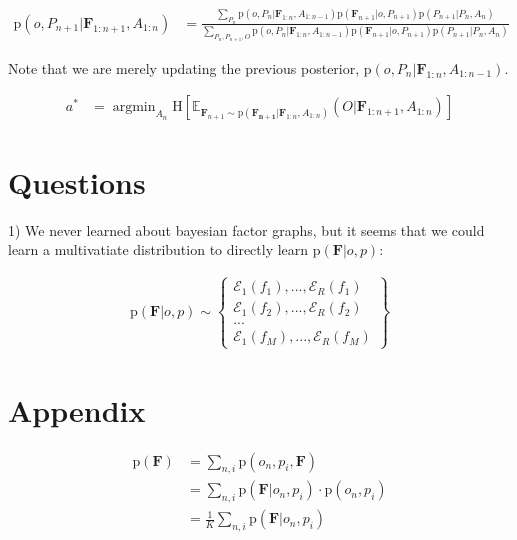 \documentclass[11pt]{article}
\newcommand{\ProbOpr}[1]{\mathbb{#1}} %
\newcommand{\SetOf}[1]{\mathbf{#1}} %
\newcommand{\prob}[1]{\text{p}(#1)} %
\newcommand{\entropy}[1]{\text{H}\left[#1\right]} %
\newcommand{\expectedValue}[2]{\ProbOpr{E}_{#2}\left(#1\right)} %
\DeclareMathOperator*{\argmin}{argmin}
\newcommand{\Eq}[1]{\begin{align*}#1\end{align*}} %
\newcommand{\cursive}[1]{\mathcal{#1}}
\begin{document}
	\Eq{\prob{o,P_{n+1}|\SetOf{F}_{1:n+1},A_{1:n}} &= \frac{ \sum_{P_n} \prob{o,P_n|\SetOf{F}_{1:n},A_{1:n-1}} \prob{\SetOf{F}_{n+1}|o,P_{n+1}} \prob{P_{n+1}|P_n,A_n}}{\sum_{P_n,P_{n+1},O} \prob{o,P_n|\SetOf{F}_{1:n},A_{1:n-1}} \prob{\SetOf{F}_{n+1}|o,P_{n+1}} \prob{P_{n+1}|P_n,A_n}} }

	Note that we are merely updating the previous posterior, $\prob{o,P_n|\SetOf{F}_{1:n},A_{1:n-1}}$. 

	\Eq{a^* &= \argmin_{A_n} \entropy{\expectedValue{O|\SetOf{F}_{1:n+1},A_{1:n}}{\SetOf{F}_{n+1} \sim \prob{\SetOf{F_{n+1}}|\SetOf{F}_{1:n},A_{1:n}}}}}

\section{Questions}
	1) We never learned about bayesian factor graphs, but it seems that we could learn a multivatiate distribution to directly learn $\prob{\SetOf{F}|o,p}$:

	\Eq{\prob{\SetOf{F}|o,p} \sim \left\{ \begin{array}{c} \cursive{E}_1(f_1), ...,  \cursive{E}_R(f_1)\\ \cursive{E}_1(f_2), ...,  \cursive{E}_R(f_2) \\ ... \\ \cursive{E}_1(f_M), ...,  \cursive{E}_R(f_M) \end{array}\right \}}

	\begin{center}
	\end{center}

	

\section{Appendix}
	\Eq{\prob{\SetOf{F}} &= \sum_{n,i} \prob{o_n,p_i,\SetOf{F}}\\
	&= \sum_{n,i} \prob{\SetOf{F}|o_n,p_i}\cdot \prob{o_n,p_i}\\
	&= \frac{1}{K} \sum_{n,i} \prob{\SetOf{F}|o_n,p_i}}
\end{document}
